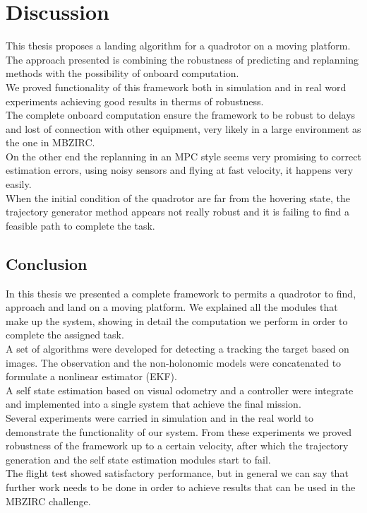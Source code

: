 \chapter{Discussion}\label{chap:discussion}
This thesis proposes a landing algorithm for a quadrotor on a moving platform.
The approach presented is combining the robustness of predicting and replanning methods with the possibility of onboard computation.\\
We proved functionality of this framework both in simulation and in real word experiments achieving good results in therms of robustness.\\
The complete onboard computation ensure the framework to be robust to delays and lost of connection with other equipment, very likely in a large environment as the one in MBZIRC.\\
On the other end the replanning in an MPC style seems very promising to correct estimation errors, using noisy sensors and flying at fast velocity, it happens very easily.\\
When the initial condition of the quadrotor are far from the  hovering state, the trajectory generator method appears not really robust and it is failing to find a feasible path to complete the task.


\section{Conclusion}\label{sec:conclusion}
In this thesis we presented a complete framework to permits a quadrotor to find, approach and land on a moving platform. We explained all the modules that make up the system, showing in detail the computation we perform in order to complete the assigned task. \\
A set of algorithms were developed for detecting a tracking the target based on images. The observation and the non-holonomic models were concatenated to formulate a nonlinear estimator (EKF).\\
A self state estimation based on visual odometry and a controller were integrate and implemented into a single system that achieve the final mission.\\
Several experiments were carried in simulation and in the real world to demonstrate the functionality of our system. From these experiments we proved robustness of the framework up to a certain velocity, after which the trajectory generation and the self state estimation modules start to fail.\\
The flight test showed satisfactory performance, but in general we can say that further work needs to be done in order to achieve results that can be used in the MBZIRC challenge.


